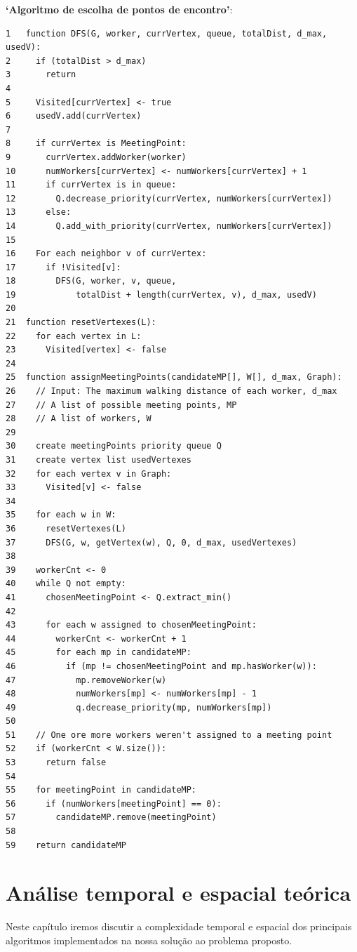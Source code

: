 \documentclass{report}
\begin{document}
  \newpage

  \textbf{`Algoritmo de escolha de pontos de encontro'}:\\
  \begin{lstlisting}
1   function DFS(G, worker, currVertex, queue, totalDist, d_max, usedV):
2     if (totalDist > d_max)
3       return
4   
5     Visited[currVertex] <- true
6     usedV.add(currVertex)
7   
8     if currVertex is MeetingPoint:
9       currVertex.addWorker(worker)
10      numWorkers[currVertex] <- numWorkers[currVertex] + 1
11      if currVertex is in queue:
12        Q.decrease_priority(currVertex, numWorkers[currVertex])
13      else:
14        Q.add_with_priority(currVertex, numWorkers[currVertex])
15    
16    For each neighbor v of currVertex:
17      if !Visited[v]:
18        DFS(G, worker, v, queue,
19            totalDist + length(currVertex, v), d_max, usedV)
20  
21  function resetVertexes(L):
22    for each vertex in L:
23      Visited[vertex] <- false
24  
25  function assignMeetingPoints(candidateMP[], W[], d_max, Graph):
26    // Input: The maximum walking distance of each worker, d_max
27    // A list of possible meeting points, MP
28    // A list of workers, W
29  
30    create meetingPoints priority queue Q
31    create vertex list usedVertexes
32    for each vertex v in Graph:
33      Visited[v] <- false
34  
35    for each w in W:
36      resetVertexes(L)
37      DFS(G, w, getVertex(w), Q, 0, d_max, usedVertexes)
38  
39    workerCnt <- 0
40    while Q not empty:
41      chosenMeetingPoint <- Q.extract_min()
42  
43      for each w assigned to chosenMeetingPoint:
44        workerCnt <- workerCnt + 1
45        for each mp in candidateMP:
46          if (mp != chosenMeetingPoint and mp.hasWorker(w)):
47            mp.removeWorker(w)
48            numWorkers[mp] <- numWorkers[mp] - 1
49            q.decrease_priority(mp, numWorkers[mp])
50  
51    // One ore more workers weren't assigned to a meeting point
52    if (workerCnt < W.size()):
53      return false
54  
55    for meetingPoint in candidateMP:
56      if (numWorkers[meetingPoint] == 0):
57        candidateMP.remove(meetingPoint)
58  
59    return candidateMP
  \end{lstlisting}

\chapter{Análise temporal e espacial teórica}
  Neste capítulo iremos discutir a complexidade temporal e espacial dos
  principais algoritmos implementados na nossa solução ao problema proposto.
\end{document}
